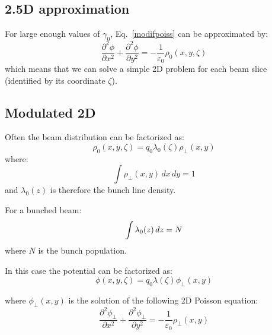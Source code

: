 \subsection{2.5D approximation}
For large enough values of $\gamma_0$, Eq.~\ref{modifpoiss} can be approximated by:
\begin{equation}
\boxed{
\frac{\partial^2 \phi}{\partial x^2} +  \frac{\partial^2 \phi}{\partial y^2} = -\frac{1}{\varepsilon_0}{\rho}_0 \left(x, y,\zeta\right) }\label{2dpoiss}
\end{equation}
which means that we can solve a simple 2D problem for each beam slice (identified by its coordinate $\zeta$).


\subsection{Modulated 2D}
\label{sec:modulated2d}

Often the beam distribution can be factorized as:
\begin{equation}
\rho_0(x,y,\zeta) = q_0\lambda_0(\zeta)\rho_\perp(x,y) 
\end{equation}
where:
\begin{equation}
\int \rho_\perp(x,y) \,dx\,dy = 1
\end{equation}
and $\lambda_0(z)$ is therefore the bunch line density.

For a bunched beam:
\begin{equation}
\int \lambda_0(z) \,dz = N \label{eq:lamnorm}\\
\end{equation}
where $N$ is the bunch population.

In this case the potential can be factorized as:
\begin{equation}
\phi(x,y,\zeta) = q_0\lambda(\zeta)\phi_\perp(x,y) 
\label{eq:factorized2d}
\end{equation}

where $\phi_\perp(x,y)$ is the solution of the following 2D Poisson equation:
\begin{equation}
\frac{\partial^2 \phi_\perp}{\partial x^2} +  \frac{\partial^2 \phi_\perp}{\partial y^2} = -\frac{1}{\varepsilon_0}{\rho}_\perp \left(x, y\right) \label{2dpoisspeerp}
\end{equation}

